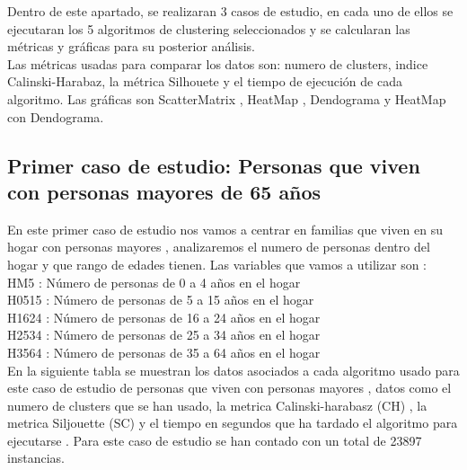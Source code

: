 	Dentro de este apartado, se realizaran 3 casos de estudio, en cada uno de ellos se ejecutaran los 5 algoritmos
	de clustering seleccionados y se calcularan las métricas y gráficas para su posterior análisis.\\

	Las métricas usadas para comparar los datos son: numero de clusters, indice Calinski-Harabaz, la métrica
	Silhouete y el tiempo de ejecución de cada algoritmo. Las gráficas son ScatterMatrix , HeatMap , Dendograma y HeatMap con Dendograma.


	\subsection[Caso de estudio 1. Personas que viven con personas mayores de 65 años]{Primer caso de estudio: Personas que viven con personas mayores de 65 años}

	En este primer caso de estudio nos vamos a centrar en familias que viven en su hogar con personas mayores , analizaremos el numero de personas
	dentro del hogar y que rango de edades tienen.
	Las variables que vamos a utilizar son : \\

	HM5 : Número de personas de 0 a 4 años en el hogar \\
	H0515 : Número de personas de 5 a 15 años en el hogar  \\
	H1624 : Número de personas de 16 a 24 años en el hogar  \\
	H2534  : Número de personas de 25 a 34 años en el hogar \\
	H3564 : Número de personas de 35 a 64 años en el hogar   \\

	En la siguiente tabla se muestran los datos asociados a cada algoritmo usado para este caso de estudio
	de personas que viven con personas mayores , datos como el numero de clusters que se han usado,
	la metrica Calinski-harabasz (CH) , la metrica Siljouette (SC) y el tiempo en segundos que ha tardado
	el algoritmo para ejecutarse . Para este caso de estudio se han contado con un total de 23897 instancias.\\


